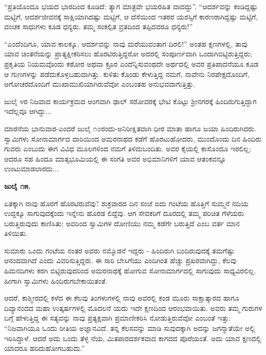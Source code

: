 “ಪ್ರತಿಯೊಂದೂ ಭಯದ ಭಾರದಿಂದ ಕೂಡಿದೆ: ತ್ಯಾಗ ಮಾತ್ರವೇ ಭಯರಹಿತ ವಾದದ್ದು”. “ಆದರ್ಶವನ್ನು ಕಂಡಿದ್ದಷ್ಟು ಮಟ್ಟಿಗೆ, ಆದರ್ಶಜೀವನಕ್ಕೆ ಸಾಕ್ಷಿಯಾಗಿದಷ್ಟು ಮಟ್ಟಿಗೆ, ಆ ದೆಸೆಯಿಂದ ಇತರರ ಯಶಸ್ಸಿಗೆ ಕಾರಣರಾಗಿದ್ದಷ್ಟು ಮಟ್ಟಿಗೆ, ವಂಚಕ ಸಾಧುಗಳು ಕೂಡ ಧನ್ಯರು, ತಮ್ಮ ಸಂಕಲ್ಪಿತ ವ್ರತದಿಂದ ತಪ್ಪಿದವರೂ ಧನ್ಯರು!”

“ಎಂದೆಂದಿಗೂ, ಯಾವ ಕಾಲಕ್ಕೂ, ಆದರ್ಶವನ್ನು ನಾವು ಮರೆಯುವಂತಾಗ ದಿರಲಿ!” ಅಂತಹ ಕ್ಷಣಗಳಲ್ಲಿ, ತಾವು ಯಾವ ಚಿಂತನೆಯನ್ನು ಪ್ರಾತ್ಯಕ್ಷೀಕರಿಸಲು ಹೊರಟಿರುತ್ತಿದ್ದರೋ ಅದರಲ್ಲಿ ಸಂಪೂರ್ಣವಾಗಿ ಒಂದಾಗಿಬಿಟ್ಟಿರುತ್ತಿದ್ದರು; ಪ್ರಕೃತಿಯ ನಿಯಮವೊಂದು ಕಠೋರ ಅಥವಾ ಕ್ರೂರ ಎಂದೆನ್ನಿಸುವಂಥದೇ ಅರ್ಥದಲ್ಲಿ ಅವರ ಪ್ರತಿಪಾದನೆಯೂ ಕೂಡ ಆ ಗುಣಗಳನ್ನು ಪಡೆದುಕೊಳ್ಳಬಹುದಾಗಿತ್ತು. ಕುಳಿತು ಕೊಂಡು ಕೇಳುತ್ತಿದ್ದ ನಮಗೆ, ನಾವೇನು ನಿರಪೇಕ್ಷದೊಂದಿಗೆ, ಅಗೋಚರದೊಂದಿಗೆ ಮುಖಾಮುಖಿಯಾಗಿರುವೆವೋ ಎಂಬಂತಹ ಅನುಭವವಾಗುತ್ತಿತ್ತು.

ಜುಲೈ ೪ರ ನಿಜವಾದ ಕಾರ್ಯಕ್ರಮದ ಅಂಗವಾಗಿ ಢಾಲ್ ಸರೋವರಕ್ಕೆ ಭೇಟಿ ಕೊಟ್ಟು ಶ‍್ರೀನಗರಕ್ಕೆ ಹಿಂದಿರುಗುತ್ತಿದ್ದಾಗ ಇದೆಲ್ಲವೂ ಆಗಿದ್ದು...

ಮಾರನೆಯ ಭಾನುವಾರ-ಎಂದರೆ ಜುಲೈ ೧೦ರಂದು-ಅನಿರೀಕ್ಷಿತವಾಗಿ ಧೀರ ಮಾತಾ ಹಾಗೂ ಜಯಾ ಹಿಂದಿರುಗಿದರು. ಸ್ವಾಮಿಗಳು ಸೋನಾಮಾರ್ಗದ ದಾರಿಯಿಂದ ಅಮರನಾಥದ ಕಡೆಗೆ ಹೊರಟುಹೋದರು, ಮುಂದೊಂದು ದಿನ ಹಿಂದಿರು ಗುವರು ಎಂಬುದು ಈಗ ವಿವಿಧ ಮೂಲಗಳಿಂದ ನಮಗೆ ತಿಳಿದುಬಂದಿತು. ಅವರ ಕೈಯಲ್ಲಿ ಕಾಸೊಂದೂ ಇರಲಿಲ್ಲ; ಆದರೂ ಸಹ ಹಿಂದೂ ಮಾತೃಭೂಮಿಯಲ್ಲಿ ಈ ಸಂಗತಿ ಅವರ ಅಭಿಮಾನಿಗಳಿಗೆ ಯಾವ ಆತಂಕವನ್ನೂ ಉಂಟುಮಾಡಲಾರದು...

\textbf{ಜುಲೈ ೧೫.}

ಏತಕ್ಕಾಗಿ ನಾವು ಹೊರಗೆ ಹೊರಟಿರುವೆವು? ಶುಕ್ರವಾರದ ದಿನ ಸಂಜೆ ಐದು ಗಂಟೆಯ ಹೊತ್ತಿಗೆ ಸುಮ್ಮನೆ ನದಿಯ ಉದ್ದಕ್ಕೂ ಸಾಗುವುದಕ್ಕೆಂದು ಇನ್ನೇನು ಹೊರಡ ಲಿದ್ದೆವು. ಆಗ ಸೇವಕರಿಗೆ ದೂರದಲ್ಲಿ ತಮ್ಮ ಪರಿಚಿತ ಗೆಳೆಯರು ಬರುತ್ತಿರುವುದು ಕಾಣಿಸಿತು; ಅವರಿಂದ ಸ್ವಾಮಿಗಳ ದೋಣಿಯು ನಮ್ಮ ಕಡೆಗೇ ಬರುತ್ತಿದೆ ಎಂಬ ವರ್ತ ಮಾನ ತಿಳಿಯಿತು.

ಸುಮಾರು ಒಂದು ಗಂಟೆಯ ನಂತರ ಅವರು ನಮ್ಮೊಡನೆ ಇದ್ದರು - ಹಿಂದಿರುಗಿ ಬಂದಿರುವುದಕ್ಕೆ ತಮಗೆಷ್ಟು ಆನಂದವಾಗಿದೆ ಎಂದು ವಿವರಿಸುತ್ತಿದ್ದರು. ಈ ಸಾರಿ ಬೇಸಿಗೆಯು ಎಂದಿಗಿಂತ ಹೆಚ್ಚು ಪ್ರಖರವಾಗಿದ್ದು, ಕೆಲವು ಹಿಮನದಿಗಳು ಕರಗಿ ಬಿಟ್ಟಿರುವುದರಿಂದ ಅಮರನಾಥಕ್ಕೆ ಹೋಗುವ ಸೋನಾಮಾರ್ಗದಲ್ಲಿ ಸಾಗುವುದು ಸಾಧ್ಯವಿರಲಿಲ್ಲ. ಹೀಗಾಗಿ ಸ್ವಾಮಿಗಳು ಹಿಂದಿರುಗಬೇಕಾಯಿತಂತೆ.

ಆದರೆ, ಕಾಶ್ಮೀರದಲ್ಲಿ ಕಳೆದ ಈ ಕೆಲವು ತಿಂಗಳುಗಳಲ್ಲಿ ನಾವು ಅವರಲ್ಲಿ ಕಂಡ ಮೂರು ಸಾಕ್ಷಾತ್ಕಾರದ ಹಾಗೂ ದಿವ್ಯಾನಂದದ ಮಹಾ ಉತ್ಕರ್ಷಗಳಲ್ಲಿ ಮೊದಲನೆ ಯದು ಇದೇ ಕ್ಷಣದಿಂದ ಆರಂಭವಾಯಿತು. ಅವರು ತಮ್ಮ ಗುರುಗಳ ಬಗ್ಗೆ ಹೇಳುತ್ತಿದ್ದ ಈ ಸತ್ಯವನ್ನು ನಾವು ಪ್ರತ್ಯಕ್ಷವಾಗಿ ಪ್ರಮಾಣೀಕರಿಸಿ ನೋಡುತ್ತಿರುವೆವೋ ಎಂಬಂತೆ ಇತ್ತು: “ನಿಜವಾಗಿಯೂ ಒಂದು ರೀತಿಯ ಅಜ್ಞಾನವಿದೆ. ತನ್ನ ಕೆಲಸವನ್ನು ಮಾಡಿ ಸುವುದಕ್ಕಾಗಿ ಅದನ್ನು ಜಗನ್ಮಾತೆಯೇ ಅಲ್ಲಿ ಇರಿಸಿದ್ದಾಳೆ. ಆದರೆ ಅದು ಒಂದು ತೆಳ್ಳ ನೆಯ, ಮಿತಪಾರದರ್ಶಕವಾದ ಕಾಗದದ ಪೊರೆಯಂತೆ. ಅದು ಯಾವ ಕ್ಷಣದಲ್ಲಿ ಯಾದರೂ ಹರಿದುಹೋಗಬಹುದು.”


